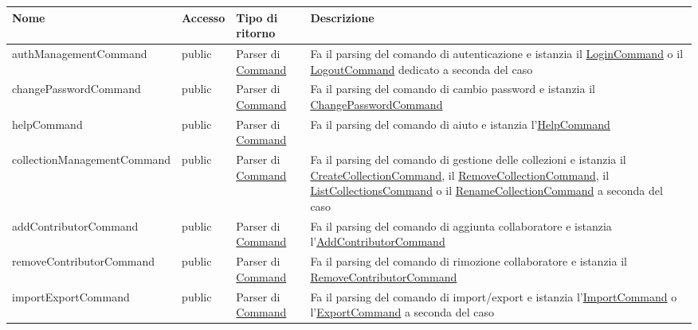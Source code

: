 \documentclass{scalatekids-article}
\begin{document}
\begin{tabular}{| p{5.5cm} | p{1.5cm} | p{2cm} | p{7.5cm} |}
  \hline
  Nome & Accesso & Tipo di ritorno & Descrizione\\
  \hline
  authManagementCommand & public & Parser di \hyperref[sec:actorbase::cli::models::Command]{Command} & Fa il parsing del comando di autenticazione e istanzia il \hyperref[sec:actorbase::cli::models::LoginCommand]{LoginCommand} o il \hyperref[sec:actorbase::cli::models::LogoutCommand]{LogoutCommand} dedicato a seconda del caso\\
  \hline
  changePasswordCommand & public & Parser di \hyperref[sec:actorbase::cli::models::Command]{Command} & Fa il parsing del comando di cambio password e istanzia il \hyperref[sec:actorbase::cli::models::ChangePasswordCommand]{ChangePasswordCommand}\\
  \hline
  helpCommand & public & Parser di \hyperref[sec:actorbase::cli::models::Command]{Command} & Fa il parsing del comando di aiuto e istanzia l'\hyperref[sec:actorbase::cli::models::HelpCommand]{HelpCommand}\\
  \hline
  collectionManagementCommand & public & Parser di \hyperref[sec:actorbase::cli::models::Command]{Command} & Fa il parsing del comando di gestione delle collezioni e istanzia il \hyperref[sec:actorbase::cli::models::CreateCollectionCommand]{CreateCollectionCommand}, il \hyperref[sec:actorbase::cli::models::RemoveCollectionCommand]{RemoveCollectionCommand}, il \hyperref[sec:actorbase::cli::models::ListCollectionsCommand]{ListCollectionsCommand} o il \hyperref[sec:actorbase::cli::models::RenameCollectionCommand]{RenameCollectionCommand} a seconda del caso\\
  \hline
  addContributorCommand & public & Parser di \hyperref[sec:actorbase::cli::models::Command]{Command} & Fa il parsing del comando di aggiunta collaboratore e istanzia l'\hyperref[sec:actorbase::cli::models::AddContributorCommand]{AddContributorCommand}\\
  \hline
  removeContributorCommand & public & Parser di \hyperref[sec:actorbase::cli::models::Command]{Command} &
                                                                                                          Fa il parsing del comando di rimozione collaboratore e istanzia il \hyperref[sec:actorbase::cli::models::RemoveContributorCommand]{RemoveContributorCommand}\\
  \hline
  importExportCommand & public & Parser di \hyperref[sec:actorbase::cli::models::Command]{Command} & Fa il parsing del comando di import/export e istanzia l'\hyperref[sec:actorbase::cli::models::ImportCommand]{ImportCommand} o l'\hyperref[sec:actorbase::cli::models::ExportCommand]{ExportCommand} a seconda del caso\\

\end{tabular}
\end{document}
